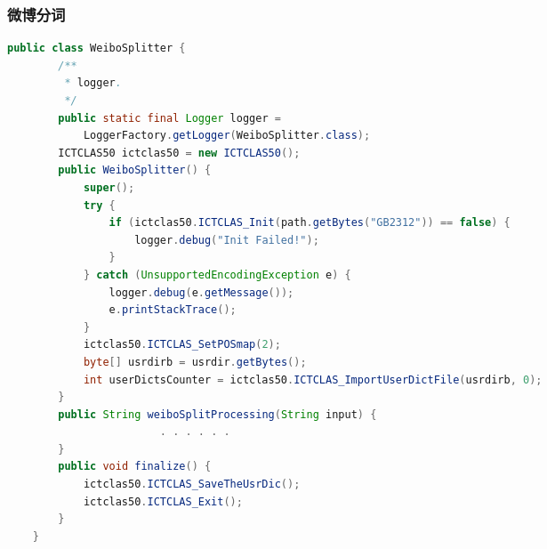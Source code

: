 \documentclass[CJKutf8, table, handout]{beamer}
\begin{document}
\begin{CJK}{UTF8}{gbsn}

\begin{frame}[fragile]
  \frametitle{微博分词}
  \lstset{language=Java,basicstyle=\ttfamily,commentstyle=\ttfamily}
  \begin{tiny}
    \begin{block}{}
      \begin{lstlisting}[language=Java]
    public class WeiboSplitter {
	    /**
	     * logger.
	     */
	    public static final Logger logger = 
            LoggerFactory.getLogger(WeiboSplitter.class);
        ICTCLAS50 ictclas50 = new ICTCLAS50();
        public WeiboSplitter() {
            super();
            try {
                if (ictclas50.ICTCLAS_Init(path.getBytes("GB2312")) == false) {
                    logger.debug("Init Failed!");
                }
            } catch (UnsupportedEncodingException e) {
                logger.debug(e.getMessage());
                e.printStackTrace();
            }
            ictclas50.ICTCLAS_SetPOSmap(2);
            byte[] usrdirb = usrdir.getBytes();
            int userDictsCounter = ictclas50.ICTCLAS_ImportUserDictFile(usrdirb, 0);
        }
        public String weiboSplitProcessing(String input) {
                        . . . . . .
        }
        public void finalize() {
            ictclas50.ICTCLAS_SaveTheUsrDic();
            ictclas50.ICTCLAS_Exit();
        }
    }
      \end{lstlisting}
    \end{block}
  \end{tiny}
\end{frame}


\end{CJK}
\end{document}
